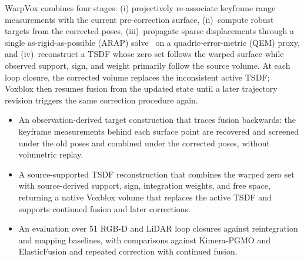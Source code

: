 WarpVox combines four stages: (i) projectively re-associate keyframe range measurements with the current pre-correction surface, (ii)~compute robust targets from the corrected poses, (iii)~propagate sparse displacements through a single as-rigid-as-possible (ARAP) solve~\cite{ARAP_modeling:2007} on a quadric-error-metric (QEM) proxy, and (iv)~reconstruct a TSDF whose zero set follows the warped surface while observed support, sign, and weight primarily follow the source volume. At each loop closure, the corrected volume replaces the inconsistent active TSDF; Voxblox then resumes fusion from the updated state until a later trajectory revision triggers the same correction procedure again. 

\begin{itemize}
\item An observation-derived target construction that traces fusion backwards: the keyframe measurements behind each surface point are recovered and screened under the old poses and combined under the corrected poses, without volumetric replay.
\item A source-supported TSDF reconstruction that combines the warped zero set with source-derived support, sign, integration weights, and free space, returning a native Voxblox volume that replaces the active TSDF and supports continued fusion and later corrections.
\item An evaluation over 51 RGB-D and LiDAR loop closures against reintegration and mapping baselines, with comparisons against Kimera-PGMO and ElasticFusion and repeated correction with continued fusion.
\end{itemize}